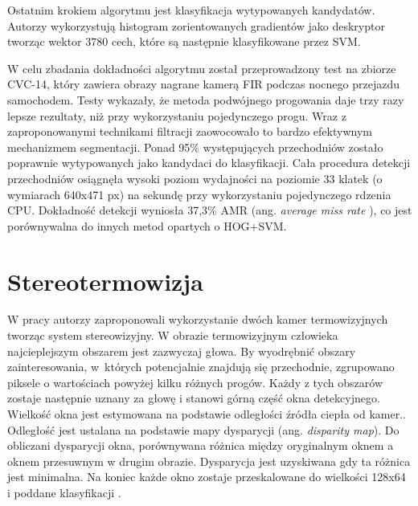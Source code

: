 Ostatnim krokiem algorytmu jest klasyfikacja wytypowanych kandydatów. 
Autorzy wykorzystują histogram zorientowanych gradientów jako deskryptor tworząc wektor 3780 cech, które są następnie klasyfikowane przez SVM.

W celu zbadania dokładności algorytmu został przeprowadzony test na zbiorze CVC-14, który zawiera obrazy nagrane kamerą FIR podczas nocnego przejazdu samochodem. 
Testy wykazały, że metoda podwójnego progowania daje trzy razy lepsze rezultaty, niż przy wykorzystaniu pojedynczego progu.  Wraz z zaproponowanymi technikami filtracji zaowocowało to bardzo efektywnym mechanizmem segmentacji. Ponad 95\% występujących przechodniów zostało poprawnie wytypowanych jako kandydaci do klasyfikacji. 
Cała procedura detekcji przechodniów osiągnęła wysoki poziom wydajności na poziomie 33 klatek (o wymiarach 640x471 px) na sekundę przy wykorzystaniu pojedynczego rdzenia CPU. Dokładność detekcji wyniosła 37,3\% AMR
(ang. \textit{ average miss rate }), co jest porównywalna do innych metod opartych o HOG+SVM.

\section{Stereotermowizja}
W pracy \cite{suard2006pedestrian} autorzy zaproponowali wykorzystanie dwóch kamer termowizyjnych tworząc system stereowizyjny. W obrazie termowizyjnym człowieka najcieplejszym obszarem jest zazwyczaj głowa. By wyodrębnić obszary zainteresowania, w~których potencjalnie znajdują się przechodnie, zgrupowano piksele o wartościach powyżej kilku różnych progów. Każdy z tych obszarów zostaje następnie uznany za głowę i stanowi górną część okna detekcyjnego. Wielkość okna jest estymowana na podstawie odległości źródła ciepła od kamer.. Odległość jest ustalana na podstawie mapy dysparycji (ang. \textit{disparity map}). Do obliczani dysparycji okna, porównywana różnica między oryginalnym oknem a oknem przesuwnym w drugim obrazie. Dysparycja jest uzyskiwana gdy ta różnica jest minimalna. Na koniec każde okno zostaje przeskalowane do wielkości 128x64 i poddane klasyfikacji . %

